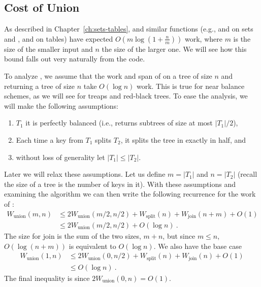 %
%



\subsection*{Cost of Union}

As described in Chapter~\ref{ch:sets-tables}, \cunion{} and similar
functions (e.g.,  and  on sets
and ,  and  on tables) have
expected $O(m \log (1 + \tfrac{n}m))$ work, where $m$ is the size of
the smaller input and $n$ the size of the larger one.
We will see how
this bound falls out very naturally from the  code.

To analyze , we assume that the work and span of
\csplit{} on a tree of size $n$ and \cjoin{} returning a tree of size
$n$ take $O(\log n)$ work.  This is true for near balance schemes, as
we will see for treaps and red-black trees.
To ease the analysis, we will make the following assumptions:
\begin{enumerate}
\item $T_1$ it is perfectly balanced (i.e., \cexpose{} returns subtrees of
  size at most $|T_1|/2$), 
\item Each time a key from $T_1$ splits $T_2$, it splits the tree in
  exactly in half, and
\item without loss of generality let $|T_1| \leq |T_2|$.
\end{enumerate}
Later we will relax these assumptions.  Let us define $m = |T_1|$ and
$n = |T_2|$ (recall the size of a tree is the number of keys in it).
With these assumptions and examining the algorithm we can then write
the following recurrence for the work of :
\begin{align*}
  W_{\mbox{union}}(m, n) &\leq 2W_{\mbox{union}}(m/2,n/2) + W_{\mbox{split}}(n)
+ W_{\mbox{join}}(n+m) + O(1)\\
   & \leq  2W_{\mbox{union}}(m/2, n/2) + O(\log n)~.
\end{align*}  
The size for join is the sum of the two sizes, $m+n$, but since 
$m \leq n$, $O(\log (n + m))$ is equivalent to $O(\log n)$.
We also have the base case
\begin{align*}
  W_{\mbox{union}}(1, n) & \leq 2W_{\mbox{union}}(0,n/2) + W_{\mbox{split}}(n)
+ W_{\mbox{join}}(n) + O(1)\\
         & \leq O(\log n)~.
\end{align*}
The final inequality is since $2W_{\mbox{union}}(0,n) = O(1)$.

